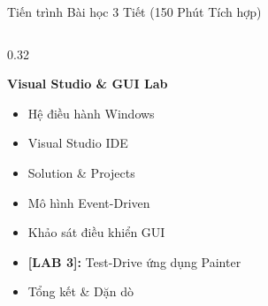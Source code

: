 \documentclass[aspectratio=169, 10pt]{beamer}
\begin{document}
\begin{frame}{Tiến trình Bài học 3 Tiết (150 Phút Tích hợp)}
\begin{columns}[T]
    \begin{column}{0.32\textwidth}
      \begin{tcolorbox}[colback=UniGreen!5,colframe=UniGreen,title=\textbf{TIẾT 3 (50')},fonttitle=\small\bfseries]
        \textbf{Visual Studio \& GUI Lab}
        \begin{itemize}\scriptsize
          \item Hệ điều hành Windows
          \item Visual Studio IDE
          \item Solution \& Projects
          \item Mô hình Event-Driven
          \item Khảo sát điều khiển GUI
          \item \textbf{[LAB 3]:} Test-Drive ứng dụng Painter
          \item Tổng kết \& Dặn dò
        \end{itemize}
      \end{tcolorbox}
    \end{column}
  \end{columns}
\end{frame}
\end{document}
